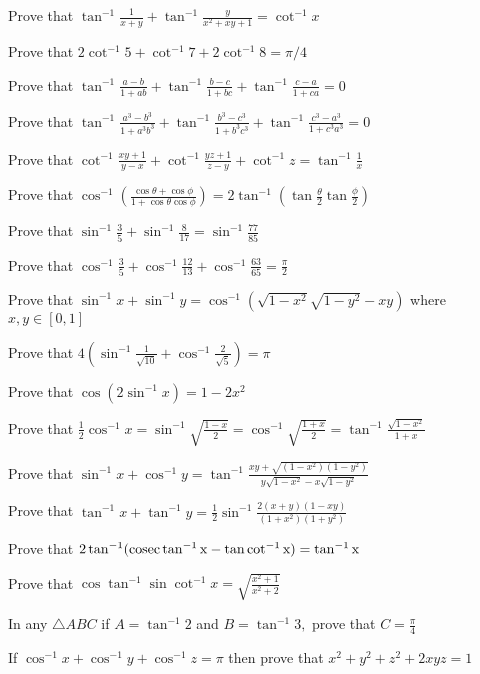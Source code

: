 \item Prove that $\tan^{-1}\frac{1}{x + y} + \tan^{-1}\frac{y}{x^2 + xy + 1} = \cot^{-1}x$
\item Prove that $2\cot^{-1}5 + \cot^{-1}7 + 2\cot^{-1}8 = \pi/4$
\item Prove that $\tan^{-1}\frac{a - b}{1 + ab} + \tan^{-1}\frac{b - c}{1 + bc} + \tan^{-1}\frac{c - a}{1 + ca} = 0$
\item Prove that $\tan^{-1}\frac{a^3 - b^3}{1 + a^3b^3} + \tan^{-1}\frac{b^3 - c^3}{1 + b^3c^3} + \tan^{-1}\frac{c^3 - a^3}{1 +
    c^3a^3} = 0$
\item Prove that $\cot^{-1}\frac{xy + 1}{y - x} + \cot^{-1}\frac{yz + 1}{z - y} + \cot^{-1}z = \tan^{-1}\frac{1}{x}$
\item Prove that $\cos^{-1}\left(\frac{\cos\theta + \cos\phi}{1 + \cos\theta\cos\phi}\right) =
    2\tan^{-1}\left(\tan\frac{\theta}{2}\tan\frac{\phi}{2}\right)$
\item Prove that $\sin^{-1}\frac{3}{5} + \sin^{-1}\frac{8}{17} = \sin^{-1}\frac{77}{85}$
\item Prove that $\cos^{-1}\frac{3}{5} + \cos^{-1}\frac{12}{13} + \cos^{-1}\frac{63}{65} = \frac{\pi}{2}$
\item Prove that $\sin^{-1}x + \sin^{-1}y = \cos^{-1}\left(\sqrt{1 - x^2}\sqrt{1 - y^2} - xy\right)$ where $x, y \in[0,
    1]$
\item Prove that $4\left(\sin^{-1}\frac{1}{\sqrt{10}} + \cos^{-1}\frac{2}{\sqrt{5}}\right) =\pi$
\item Prove that $\cos(2\sin^{-1}x) = 1 - 2x^2$
\item Prove that $\frac{1}{2}\cos^{-1}x = \sin^{-1}\sqrt{\frac{1 - x}{2}} = \cos^{-1}\sqrt{\frac{1 + x}{2}} =
    \tan^{-1}\frac{\sqrt{1 - x^2}}{1 + x}$
\item Prove that $\sin^{-1}x + \cos^{-1}y = \tan^{-1}\frac{xy + \sqrt{(1 - x^2)(1 - y^2)}}{y\sqrt{1 - x^2} - x\sqrt{1 - y^2}}$
\item Prove that $\tan^{-1}x + \tan^{-1}y = \frac{1}{2}\sin^{-1}\frac{2(x + y)(1 - xy)}{(1 + x^2)(1 + y^2)}$
\item Prove that $2\tan^{-1}(\rm cosec\tan^{-1}x - \tan\cot^{-1}x) = \tan^{-1}x$
\item Prove that $\cos\tan^{-1}\sin\cot^{-1}x = \sqrt{\frac{x^2 + 1}{x^2 + 2}}$
\item In any $\triangle ABC$ if $A = \tan^{-1}2$ and $B = \tan^{-1}3,$ prove that $C = \frac{\pi}{4}$
\item If $\cos^{-1}x + \cos^{-1}y + \cos^{-1}z = \pi$ then prove that $x^2 + y^2 + z^2 + 2xyz = 1$
